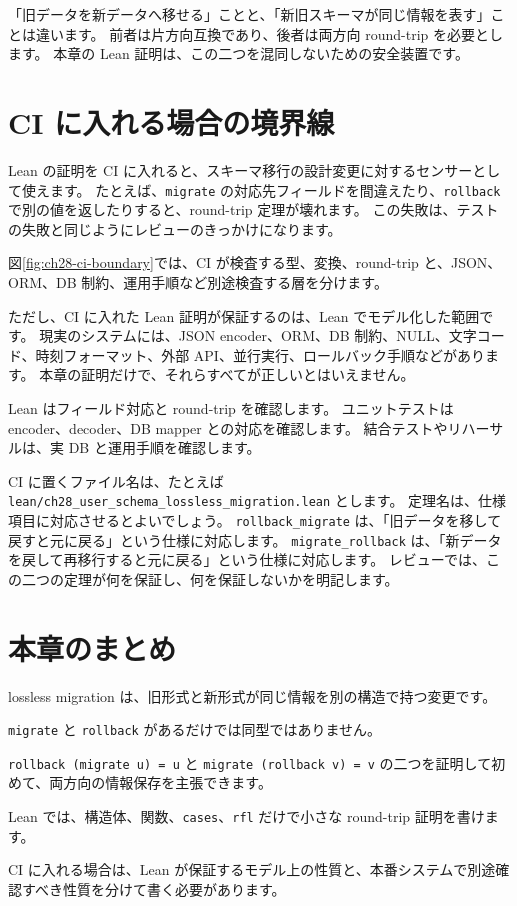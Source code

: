 「旧データを新データへ移せる」ことと、「新旧スキーマが同じ情報を表す」ことは違います。
前者は片方向互換であり、後者は両方向 round-trip を必要とします。
本章の Lean 証明は、この二つを混同しないための安全装置です。

\section{CI に入れる場合の境界線}

Lean の証明を CI に入れると、スキーマ移行の設計変更に対するセンサーとして使えます。
たとえば、\texttt{migrate} の対応先フィールドを間違えたり、\texttt{rollback} で別の値を返したりすると、round-trip 定理が壊れます。
この失敗は、テストの失敗と同じようにレビューのきっかけになります。

図\ref{fig:ch28-ci-boundary}では、CI が検査する型、変換、round-trip と、JSON、ORM、DB 制約、運用手順など別途検査する層を分けます。


ただし、CI に入れた Lean 証明が保証するのは、Lean でモデル化した範囲です。
現実のシステムには、JSON encoder、ORM、DB 制約、NULL、文字コード、時刻フォーマット、外部 API、並行実行、ロールバック手順などがあります。
本章の証明だけで、それらすべてが正しいとはいえません。

Lean はフィールド対応と round-trip を確認します。
ユニットテストは encoder、decoder、DB mapper との対応を確認します。
結合テストやリハーサルは、実 DB と運用手順を確認します。

CI に置くファイル名は、たとえば \texttt{lean/ch28\_user\_schema\_lossless\_migration.lean} とします。
定理名は、仕様項目に対応させるとよいでしょう。
\texttt{rollback\_migrate} は、「旧データを移して戻すと元に戻る」という仕様に対応します。
\texttt{migrate\_rollback} は、「新データを戻して再移行すると元に戻る」という仕様に対応します。
レビューでは、この二つの定理が何を保証し、何を保証しないかを明記します。

\section{本章のまとめ}
\enlargethispage{2\baselineskip}

lossless migration は、旧形式と新形式が同じ情報を別の構造で持つ変更です。

\texttt{migrate} と \texttt{rollback} があるだけでは同型ではありません。

\texttt{rollback (migrate u) = u} と \texttt{migrate (rollback v) = v} の二つを証明して初めて、両方向の情報保存を主張できます。

Lean では、構造体、関数、\texttt{cases}、\texttt{rfl} だけで小さな round-trip 証明を書けます。

CI に入れる場合は、Lean が保証するモデル上の性質と、本番システムで別途確認すべき性質を分けて書く必要があります。
